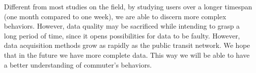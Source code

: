 \documentclass{article}
\begin{document}
Different from most studies on the field, by studying users over a longer timespan (one month compared to one week), we are able to discern more complex behaviors. However, data quality may be sacrificed while intending to grasp a long period of time, since it opens possibilities for data to be faulty. However, data acquisition methods grow as rapidly as the public transit network. We hope that in the future we have more complete data. This way we will be able to have a better understanding of commuter's behaviors. 

\newpage
{}

\end{document}
